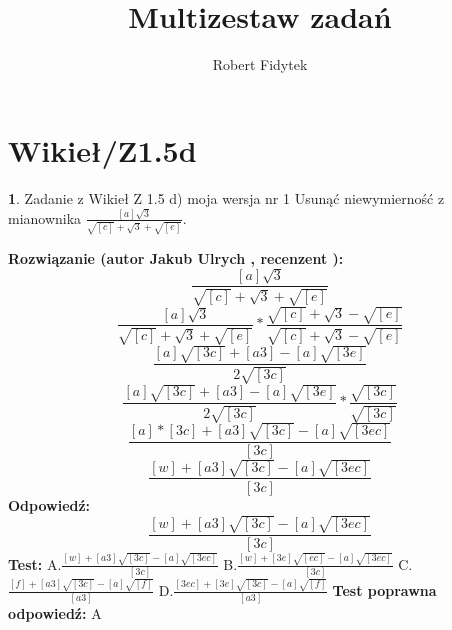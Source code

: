 \documentclass[12pt, a4paper]{article}
\title{Multizestaw zadań}
\author{Robert Fidytek}
\date{}
\theoremstyle{definition} %
\newtheorem{zad}{}
\newcommand{\kategoria}[1]{\section{#1}} %
\newcommand{\zadStart}[1]{\begin{zad}#1\newline} %
\newcommand{\zadStop}{\end{zad}}   %
\newcommand{\rozwStart}[2]{\noindent \textbf{Rozwiązanie (autor #1 , recenzent #2): }\newline} %
\newcommand{\rozwStop}{\newline}                                            %
\newcommand{\odpStart}{\noindent \textbf{Odpowiedź:}\newline}    %
\newcommand{\odpStop}{\newline}                                             %
\newcommand{\testStart}{\noindent \textbf{Test:}\newline} %
\newcommand{\testStop}{\newline} %
\newcommand{\kluczStart}{\noindent \textbf{Test poprawna odpowiedź:}\newline} %
\newcommand{\kluczStop}{\newline} %
\begin{document}
\maketitle


\kategoria{Wikieł/Z1.5d}
\zadStart{Zadanie z Wikieł Z 1.5 d) moja wersja nr 1}
Usunąć niewymierność z mianownika $\frac{[a]\sqrt{3}}{\sqrt{[c]}+\sqrt{3}+\sqrt{[e]}}$.
\zadStop
\rozwStart{Jakub Ulrych}{}
$$\frac{[a]\sqrt{3}}{\sqrt{[c]}+\sqrt{3}+\sqrt{[e]}}$$
$$\frac{[a]\sqrt{3}}{\sqrt{[c]}+\sqrt{3}+\sqrt{[e]}}*\frac{\sqrt{[c]}+\sqrt{3}-\sqrt{[e]}}{\sqrt{[c]}+\sqrt{3}-\sqrt{[e]}}$$
$$\frac{[a]\sqrt{[3c]}+[a3]-[a]\sqrt{[3e]}}{2\sqrt{[3c]}}$$
$$\frac{[a]\sqrt{[3c]}+[a3]-[a]\sqrt{[3e]}}{2\sqrt{[3c]}}*\frac{\sqrt{[3c]}}{\sqrt{[3c]}}$$
$$\frac{[a]*[3c]+[a3]\sqrt{[3c]}-[a]\sqrt{[3ec]}}{[3c]}$$
$$\frac{[w]+[a3]\sqrt{[3c]}-[a]\sqrt{[3ec]}}{[3c]}$$
\rozwStop
\odpStart
$$\frac{[w]+[a3]\sqrt{[3c]}-[a]\sqrt{[3ec]}}{[3c]}$$
\odpStop
\testStart
A.$\frac{[w]+[a3]\sqrt{[3c]}-[a]\sqrt{[3ec]}}{[3c]}$
B.$\frac{[w]+[3e]\sqrt{[ec]}-[a]\sqrt{[3ec]}}{[3c]}$
C.$\frac{[f]+[a3]\sqrt{[3c]}-[a]\sqrt{[f]}}{[a3]}$
D.$\frac{[3ec]+[3e]\sqrt{[3c]}-[a]\sqrt{[f]}}{[a3]}$
\testStop
\kluczStart
A
\kluczStop
\end{document}
